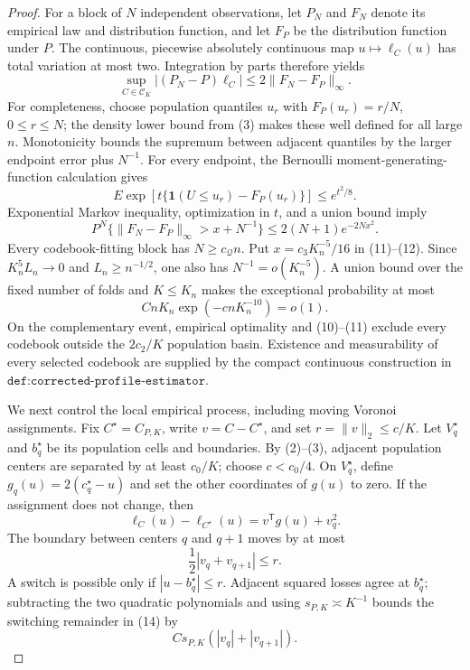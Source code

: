 \documentclass{article}
\begin{document}
\begin{proof}
For a block of \(N\) independent observations, let \(P_N\) and \(F_N\) denote its empirical law and distribution function, and let \(F_P\) be the distribution function under \(P\).  The continuous, piecewise absolutely continuous map \(u\mapsto\ell_C(u)\) has total variation at most two.  Integration by parts therefore yields
\[
 \sup_{C\in\mathcal C_K}|(P_N-P)\ell_C|\leq2\|F_N-F_P\|_\infty.            \tag{11}
\]
For completeness, choose population quantiles \(u_r\) with \(F_P(u_r)=r/N\), \(0\leq r\leq N\); the density lower bound from (3) makes these well defined for all large \(n\).  Monotonicity bounds the supremum between adjacent quantiles by the larger endpoint error plus \(N^{-1}\).  For every endpoint, the Bernoulli moment-generating-function calculation gives
\[
 E\exp[t\{\mathbf1(U\leq u_r)-F_P(u_r)\}]\leq e^{t^2/8}.
\]
Exponential Markov inequality, optimization in \(t\), and a union bound imply
\[
 P^N\{\|F_N-F_P\|_\infty>x+N^{-1}\}\leq2(N+1)e^{-2Nx^2}.                  \tag{12}
\]
Every codebook-fitting block has \(N\geq c_{\mathcal Q}n\).  Put \(x=c_3K_n^{-5}/16\) in (11)--(12).  Since \(K_n^5L_n\to0\) and \(L_n\geq n^{-1/2}\), one also has \(N^{-1}=o(K_n^{-5})\).  A union bound over the fixed number of folds and \(K\leq K_n\) makes the exceptional probability at most
\[
 CnK_n\exp(-cnK_n^{-10})=o(1).                                               \tag{13}
\]
On the complementary event, empirical optimality and (10)--(11) exclude every codebook outside the \(2c_2/K\) population basin.  Existence and measurability of every selected codebook are supplied by the compact continuous construction in \(\texttt{def:corrected-profile-estimator}\).

We next control the local empirical process, including moving Voronoi assignments.  Fix \(C^\star=C_{P,K}\), write \(v=C-C^\star\), and set \(r=\|v\|_2\leq c/K\).  Let \(V_q^\star\) and \(b_q^\star\) be its population cells and boundaries.  By (2)--(3), adjacent population centers are separated by at least \(c_0/K\); choose \(c<c_0/4\).  On \(V_q^\star\), define \(g_q(u)=2(c_q^\star-u)\) and set the other coordinates of \(g(u)\) to zero.  If the assignment does not change, then
\[
 \ell_C(u)-\ell_{C^\star}(u)=v^{\mathsf T}g(u)+v_q^2.                       \tag{14}
\]
The boundary between centers \(q\) and \(q+1\) moves by at most
\[
 \frac12|v_q+v_{q+1}|\leq r.                                                 \tag{15}
\]
A switch is possible only if \(|u-b_q^\star|\leq r\).  Adjacent squared losses agree at \(b_q^\star\); subtracting the two quadratic polynomials and using \(s_{P,K}\asymp K^{-1}\) bounds the switching remainder in (14) by
\[
 Cs_{P,K}(|v_q|+|v_{q+1}|).                                                   \tag{16}
\]


\end{proof}
\end{document}
